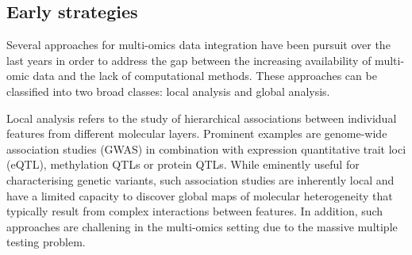 \begin{itemize}



\end{itemize}

\subsection{Early strategies}



Several approaches for multi-omics data integration have been pursuit over the last years in order to address the gap between the increasing availability of multi-omic data and the lack of computational methods. These approaches can be classified into two broad classes: local analysis and global analysis.

Local analysis refers to the study of hierarchical associations between individual features from different molecular layers. Prominent examples are genome-wide association studies (GWAS) in combination with expression quantitative trait loci (eQTL), methylation QTLs or protein QTLs. While eminently useful for characterising genetic variants, such association studies are inherently local and have a limited capacity to discover global maps of molecular heterogeneity that typically result from complex interactions between features. In addition, such approaches are challening in the multi-omics setting due to the massive multiple testing problem.\\


